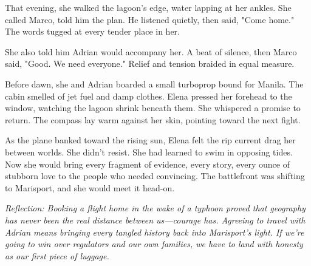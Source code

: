 That evening, she walked the lagoon's edge, water lapping at her ankles. She called Marco, told him the plan. He listened quietly, then said, "Come home." The words tugged at every tender place in her.

She also told him Adrian would accompany her. A beat of silence, then Marco said, "Good. We need everyone." Relief and tension braided in equal measure.

Before dawn, she and Adrian boarded a small turboprop bound for Manila. The cabin smelled of jet fuel and damp clothes. Elena pressed her forehead to the window, watching the lagoon shrink beneath them. She whispered a promise to return. The compass lay warm against her skin, pointing toward the next fight.

As the plane banked toward the rising sun, Elena felt the rip current drag her between worlds. She didn't resist. She had learned to swim in opposing tides. Now she would bring every fragment of evidence, every story, every ounce of stubborn love to the people who needed convincing. The battlefront was shifting to Marisport, and she would meet it head-on.


\noindent\textit{Reflection: Booking a flight home in the wake of a typhoon proved that geography has never been the real distance between us—courage has. Agreeing to travel with Adrian means bringing every tangled history back into Marisport's light. If we're going to win over regulators and our own families, we have to land with honesty as our first piece of luggage.}
